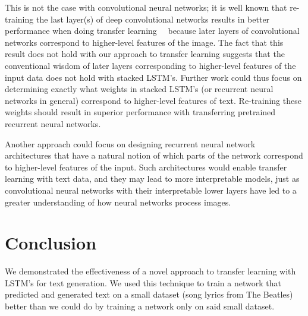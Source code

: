 \documentclass[10pt,twocolumn,letterpaper]{article}
\begin{document}
	This is not the case with convolutional neural networks; it is well known that re-training the last layer(s) of deep convolutional networks results in better performance when doing transfer learning~\cite{CNNOffTheShelf}~\cite{TransferableFeaturesNN} because later layers of convolutional networks correspond to higher-level features of the image. The fact that this result does not hold with our approach to transfer learning suggests that the conventional wisdom of later layers corresponding to higher-level features of the input data does not hold with stacked LSTM's. Further work could thus focus on determining exactly what weights in stacked LSTM's (or recurrent neural networks in general) correspond to higher-level features of text. Re-training these weights should result in superior performance with transferring pretrained recurrent neural networks.
	
	Another approach could focus on designing recurrent neural network architectures that have a natural notion of which parts of the network correspond to higher-level features of the input. Such architectures would enable transfer learning with text data, and they may lead to more interpretable models, just as convolutional neural networks with their interpretable lower layers have led to a greater understanding of how neural networks process images.

\section{Conclusion}
	We demonstrated the effectiveness of a novel approach to transfer learning with LSTM's for text generation. We used this technique to train a network that predicted and generated text on a small dataset (song lyrics from The Beatles) better than we could do by training a network only on said small dataset.

{\small


}
\end{document}
